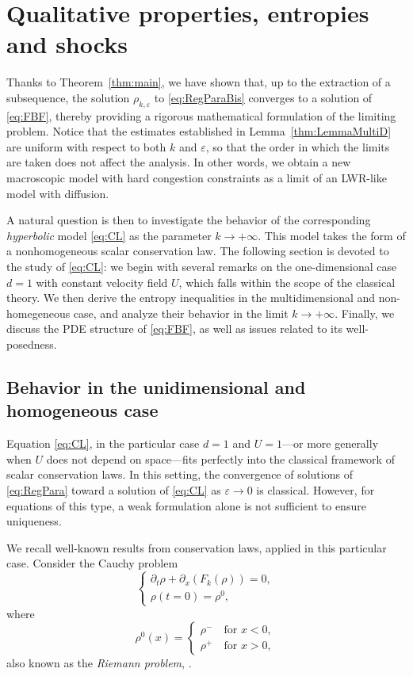 \documentclass[11pt,twoside]{article}
\numberwithin{equation}{section}
\newcommand {\eps}  {\varepsilon}
\newcommand {\p}   {\partial}
\begin{document}
\section{Qualitative properties, entropies and shocks}
\label{sec:entropies}

Thanks to Theorem~\ref{thm:main}, we have shown that, up to the extraction of a subsequence, the solution \(\rho_{k,\varepsilon}\) to \eqref{eq:RegParaBis} converges to a solution of \eqref{eq:FBF}, thereby providing a rigorous mathematical formulation of the limiting problem. Notice that the estimates established in Lemma~\ref{thm:LemmaMultiD} are uniform with respect to both \(k\) and \(\varepsilon\), so that the order in which the limits are taken does not affect the analysis. In other words, we obtain a new macroscopic model with hard congestion constraints as a limit of an LWR-like model with diffusion.

A natural question is then to investigate the behavior of the corresponding \textit{hyperbolic} model \eqref{eq:CL} as the parameter \(k \to +\infty\). This model takes the form of a nonhomogeneous scalar conservation law. The following section is devoted to the study of \eqref{eq:CL}: we begin with several remarks on the one-dimensional case \(d=1\) with constant velocity field \(U\), which falls within the scope of the classical theory. We then derive the entropy inequalities in the multidimensional and non-homegeneous case, and analyze their behavior in the limit \(k \to +\infty\). Finally, we discuss the PDE structure of \eqref{eq:FBF}, as well as issues related to its well-posedness.


\subsection{Behavior in the unidimensional and homogeneous case}



Equation \eqref{eq:CL}, in the particular case $d=1$ and $U=1$—or more generally when $U$ does not depend on space—fits perfectly into the classical framework of scalar conservation laws. In this setting, the convergence of solutions of \eqref{eq:RegPara} toward a solution of \eqref{eq:CL} as $\eps \to 0$ is classical. However, for equations of this type, a weak formulation alone is not sufficient to ensure uniqueness. 

We recall well-known results from conservation laws, applied in this particular case. Consider the Cauchy problem
\begin{equation}
\label{eq:Riemann}
\begin{cases}
    \p_t\rho + \p_x(F_k(\rho))=0, \\
    \rho(t=0)=\rho^0,
\end{cases}
\end{equation}
where 
\[
\rho^0(x) = \begin{cases}
    \rho^- \quad \text{for } x < 0, \\
    \rho^+ \quad \text{for } x>0,
\end{cases}
\]
also known as the \textit{Riemann problem}, \cite{dafermos_constantine_m_hyperbolic_2016, serre_systemes_1996}. 
\end{document}
